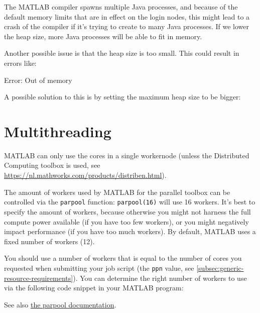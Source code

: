 \begin{prompt}
\end{prompt}

The MATLAB compiler spawns multiple Java processes, and because of the default memory
limits that are in effect on the login nodes, this might lead to a crash of the compiler
if it's trying to create to many Java processes. If we lower the heap size, more
Java processes will be able to fit in memory.

Another possible issue is that the heap size is too small. This could result
in errors like:

\begin{prompt}
Error: Out of memory
\end{prompt}

A possible solution to this is by setting the maximum heap size to be bigger:

\begin{prompt}
\end{prompt}

\section{Multithreading}

MATLAB can only use the cores in a single
workernode (unless the Distributed Computing toolbox is used, see
\url{https://nl.mathworks.com/products/distriben.html}).


The amount of workers used by MATLAB for the parallel toolbox can be controlled
via the \lstinline|parpool| function: \lstinline|parpool(16)| will use 16 workers.
It's best to specify the amount of workers,
because otherwise you might not harness the full compute power available (if you have
too few workers), or you might negatively impact performance (if you have too much workers).
By default, MATLAB uses a fixed number of workers (12).

You should use a number of workers that is equal to the number of cores you requested
when submitting your job script (the \lstinline|ppn| value, see \autoref{subsec:generic-resource-requirements}).
You can determine the right number of workers to use via the following code snippet in your MATLAB program:



See also \href{https://nl.mathworks.com/help/distcomp/parpool.html}{the parpool documentation}.


